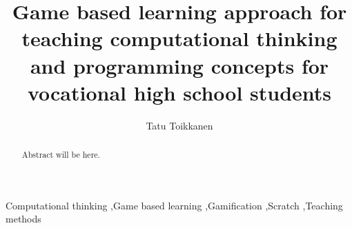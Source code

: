 \documentclass[final,5p,times,twocolumn,authoryear]{elsarticle}
\begin{document}
\begin{frontmatter}




\title{Game based learning approach for teaching computational thinking and programming concepts for vocational high school students}


\author{Tatu Toikkanen}


\begin{abstract}
Abstract will be here.
\end{abstract}



\begin{keyword}
Computational thinking \sep Game based learning \sep Gamification \sep Scratch \sep Teaching methods



\end{keyword}


\end{frontmatter}
\end{document}
